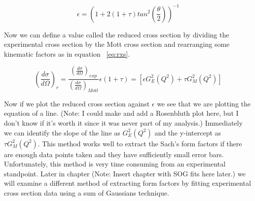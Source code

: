 \begin{equation} \label{eq:epsilon}
\epsilon = \left( 1 + 2(1+\tau)tan^2\left( \frac{\theta}{2} \right) \right)^{-1}
\end{equation}

Now we can define a value called the reduced cross section by dividing the experimental cross section by the Mott cross section and rearranging some kinematic factors as in equation ~\ref{eq:rxs}.

\begin{equation} \label{eq:rxs}
\left(\frac{d\sigma}{d\Omega}\right)_{r} = \frac{\left( \frac{d\sigma}{d\Omega} \right)_{exp}}{\left( \frac{d\sigma}{d\Omega} \right)_{Mott}} \epsilon (1+\tau) = \left[ \epsilon G_E^2\left(Q^2\right) + \tau G_M^2\left(Q^2\right) \right]
\end{equation}

\noindent Now if we plot the reduced cross section against $\epsilon$ we see that we are plotting the equation of a line. (Note: I could make and add a Rosenbluth plot here, but I don't know if it's worth it since it was never part of my analysis.) Immediately we can identify the slope of the line as $G_E^2\left(Q^2\right)$ and the y-intercept as $\tau G_M^2\left(Q^2\right)$. This method works well to extract the Sach's form factors if there are enough data points taken and they have sufficiently small error bars. Unfortunately, this method is very time consuming from an experimental standpoint. Later in chapter (Note: Insert chapter with SOG fits here later.) we will examine a different method of extracting form factors by fitting experimental cross section data using a sum of Gaussians technique. 